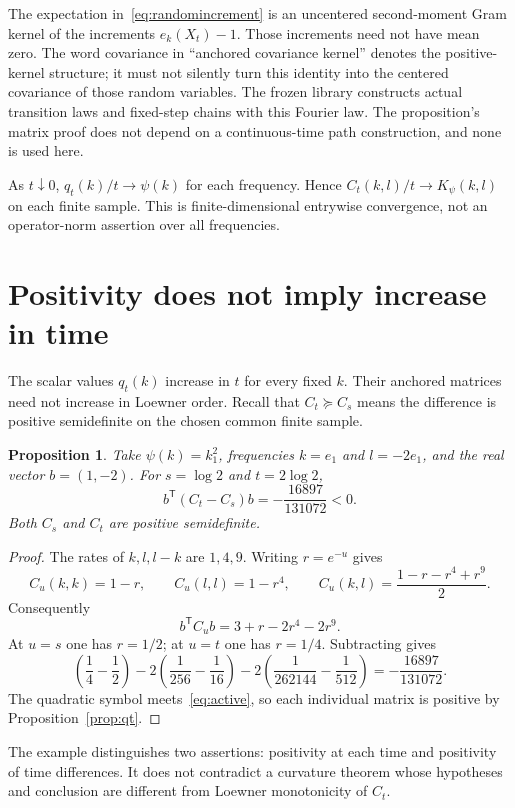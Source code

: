 \documentclass[11pt]{article}
\newtheorem{proposition}[theorem]{Proposition}
\theoremstyle{remark}\newtheorem{remark}[theorem]{Remark}
\begin{document}
The expectation in~\eqref{eq:randomincrement} is an uncentered
second-moment Gram kernel of the increments $e_k(X_t)-1$.
Those increments need not have mean zero. The word covariance
in ``anchored covariance kernel'' denotes the positive-kernel
structure; it must not silently turn this identity into the
centered covariance of those random variables. The frozen library
constructs actual transition laws and fixed-step chains with
this Fourier law. The proposition's matrix proof does not depend
on a continuous-time path construction, and none is used here.

As $t\downarrow0$, $q_t(k)/t\to\psi(k)$ for each frequency.
Hence $C_t(k,l)/t\to K_\psi(k,l)$ on each finite sample.
This is finite-dimensional entrywise convergence, not an
operator-norm assertion over all frequencies.

\section{Positivity does not imply increase in time}
The scalar values $q_t(k)$ increase in $t$ for every fixed
$k$. Their anchored matrices need not increase in Loewner
order. Recall that $C_t\succeq C_s$ means the difference is
positive semidefinite on the chosen common finite sample.

\begin{proposition}\label{prop:nonmonotone}
Take $\psi(k)=k_1^2$, frequencies $k=e_1$ and $l=-2e_1$,
and the real vector $b=(1,-2)$. For $s=\log2$ and $t=2\log2$,
\begin{equation}\label{eq:negative}
 b^{\mathsf T}(C_t-C_s)b=-\frac{16897}{131072}<0.
\end{equation}
Both $C_s$ and $C_t$ are positive semidefinite.
\end{proposition}
\begin{proof}
The rates of $k,l,l-k$ are $1,4,9$. Writing $r=e^{-u}$ gives
\[
 C_u(k,k)=1-r,\qquad C_u(l,l)=1-r^4,
 \qquad C_u(k,l)=\frac{1-r-r^4+r^9}{2}.
\]
Consequently
\[
 b^{\mathsf T}C_ub=3+r-2r^4-2r^9.
\]
At $u=s$ one has $r=1/2$; at $u=t$ one has $r=1/4$.
Subtracting gives
\[
 \left(\frac14-\frac12\right)
 -2\left(\frac1{256}-\frac1{16}\right)
 -2\left(\frac1{262144}-\frac1{512}\right)
                         =-\frac{16897}{131072}.
\]
The quadratic symbol meets~\eqref{eq:active}, so each individual
matrix is positive by Proposition~\ref{prop:qt}.
\end{proof}

The example distinguishes two assertions: positivity at each
time and positivity of time differences. It does not contradict
a curvature theorem whose hypotheses and conclusion are
different from Loewner monotonicity of $C_t$.
\end{document}
